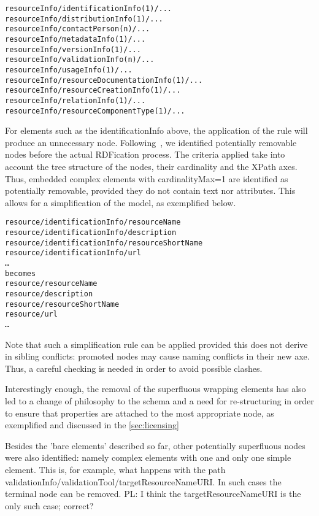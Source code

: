 \documentclass{llncs}
\begin{document}
{{\footnotesize
\begin{verbatim}
resourceInfo/identificationInfo(1)/...
resourceInfo/distributionInfo(1)/...
resourceInfo/contactPerson(n)/...
resourceInfo/metadataInfo(1)/...
resourceInfo/versionInfo(1)/...
resourceInfo/validationInfo(n)/...
resourceInfo/usageInfo(1)/...
resourceInfo/resourceDocumentationInfo(1)/...
resourceInfo/resourceCreationInfo(1)/...
resourceInfo/relationInfo(1)/...
resourceInfo/resourceComponentType(1)/...
\end{verbatim}}
For elements such as the identificationInfo above, the application of the rule will produce an unnecessary node. Following~\cite{Villegas2014}, we identified potentially removable nodes before the actual RDFication process. The criteria applied take into account the tree structure of the nodes, their cardinality and the XPath axes. Thus, embedded complex elements with cardinalityMax=1 are identified as potentially removable, provided they do not contain text nor attributes. This allows for a simplification of the model, as exemplified below.
{\footnotesize
\begin{verbatim}
resource/identificationInfo/resourceName
resource/identificationInfo/description
resource/identificationInfo/resourceShortName
resource/identificationInfo/url
…
becomes
resource/resourceName
resource/description
resource/resourceShortName
resource/url
…
\end{verbatim}}
Note that such a simplification rule can be applied provided this does not derive in sibling conflicts: promoted nodes may cause naming conflicts in their new axe. Thus, a careful checking is needed in order to avoid possible clashes.

Interestingly enough, the removal of the superfluous wrapping elements has also led to a change of philosophy to the schema and a need for re-structuring in order to ensure that properties are attached to the most appropriate node, as exemplified and discussed in the \ref{sec:licensing}

Besides the 'bare elements' described so far, other potentially superfluous nodes were also identified: namely complex elements with one and only one simple element. This is, for example, what happens with the path validationInfo/validationTool/targetResourceNameURI. In such cases the terminal node can be removed.
{PL: I think the targetResourceNameURI is the only such case; correct?}

}
\end{document}
